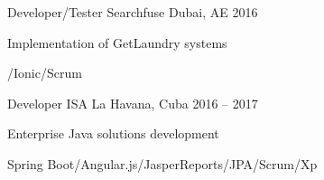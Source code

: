 \begin{cventries}

\cventry
{Developer/Tester} %
{Searchfuse} %
{Dubai, AE} %
{2016} %
{ %
\begin{cvitems}
\item {Implementation of GetLaundry systems}
\item {/Ionic/Scrum}
\end{cvitems}
}


\cventry
{Developer} %
{ISA} %
{La Havana, Cuba} %
{2016 – 2017} %
{ %
\begin{cvitems}
\item {Enterprise Java solutions development}
\item {Spring Boot/Angular.js/JasperReports/JPA/Scrum/Xp}
\end{cvitems}
}



\end{cventries}

